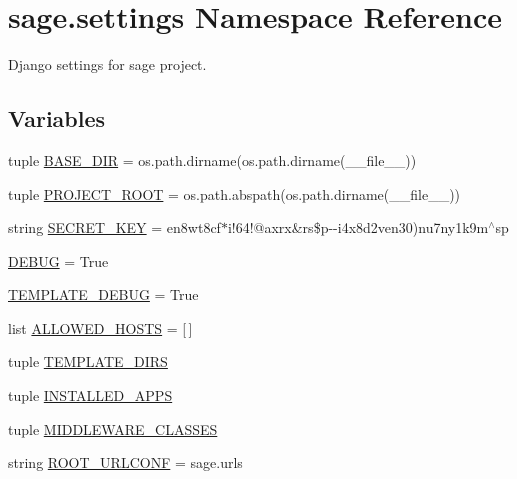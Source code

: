 \hypertarget{namespacesage_1_1settings}{}\section{sage.\+settings Namespace Reference}
\label{namespacesage_1_1settings}


Django settings for sage project.  


\subsection*{Variables}
\begin{DoxyCompactItemize}
\item 
tuple \hyperlink{namespacesage_1_1settings_add6d83672b1137d74a06bf1606aecf04}{B\+A\+S\+E\+\_\+\+D\+I\+R} = os.\+path.\+dirname(os.\+path.\+dirname(\+\_\+\+\_\+file\+\_\+\+\_\+))
\item 
tuple \hyperlink{namespacesage_1_1settings_ae2e71004e0684c0243b4e9792726cd0f}{P\+R\+O\+J\+E\+C\+T\+\_\+\+R\+O\+O\+T} = os.\+path.\+abspath(os.\+path.\+dirname(\+\_\+\+\_\+file\+\_\+\+\_\+))
\item 
string \hyperlink{namespacesage_1_1settings_acc7cb44e3d92fc1334c19318ede49bc8}{S\+E\+C\+R\+E\+T\+\_\+\+K\+E\+Y} = \textquotesingle{}en8wt8cf$\ast$i!64!@axrx\&rs\$p-\/-\/i4x8d2ven30)nu7ny1k9m$^\wedge$sp\textquotesingle{}
\item 
\hyperlink{namespacesage_1_1settings_acc28086c56df6aed910b2552e07944cc}{D\+E\+B\+U\+G} = True
\item 
\hyperlink{namespacesage_1_1settings_a74c98bee40b9b06d51e44be6df73eb46}{T\+E\+M\+P\+L\+A\+T\+E\+\_\+\+D\+E\+B\+U\+G} = True
\item 
list \hyperlink{namespacesage_1_1settings_a2eb98def792cf73bbc5884024afc5602}{A\+L\+L\+O\+W\+E\+D\+\_\+\+H\+O\+S\+T\+S} = \mbox{[}$\,$\mbox{]}
\item 
tuple \hyperlink{namespacesage_1_1settings_addc90c15790d385d304972f1b3098a86}{T\+E\+M\+P\+L\+A\+T\+E\+\_\+\+D\+I\+R\+S}
\item 
tuple \hyperlink{namespacesage_1_1settings_af48e999a4a4e7f8830d84ac4eb08df1a}{I\+N\+S\+T\+A\+L\+L\+E\+D\+\_\+\+A\+P\+P\+S}
\item 
tuple \hyperlink{namespacesage_1_1settings_a247a0ea3c79f999897dbfaed3bc99b1d}{M\+I\+D\+D\+L\+E\+W\+A\+R\+E\+\_\+\+C\+L\+A\+S\+S\+E\+S}
\item 
string \hyperlink{namespacesage_1_1settings_a92b3d804acae3871a9877ad143df4201}{R\+O\+O\+T\+\_\+\+U\+R\+L\+C\+O\+N\+F} = \textquotesingle{}sage.\+urls\textquotesingle{}

\end{DoxyCompactItemize}
